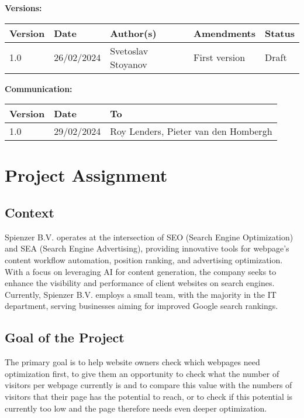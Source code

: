 \documentclass[12pt,a4paper]{article}
\begin{document}
\vspace{1em} %

\textbf{Versions:} 
\vspace{1em}

\begin{tabular}{|l|l|l|p{5cm}|l|}
    \hline
    Version & Date & Author(s) & Amendments & Status \\
    \hline
    1.0 & 26/02/2024 & Svetoslav Stoyanov & First version & Draft \\
    \hline
\end{tabular}

\vspace{1em} %

\textbf{Communication:} 
\vspace{1em} %

\begin{tabular}{|l|l|l|}
    \hline
    Version & Date & To \\
    \hline
    1.0 & 29/02/2024 & Roy Lenders, Pieter van den Hombergh \\
    \hline
\end{tabular}

\newpage

\tableofcontents
\newpage

\section{Project Assignment}
\subsection{Context}
Spienzer B.V. operates at the intersection of SEO (Search Engine Optimization) and SEA (Search Engine Advertising), providing innovative tools for webpage’s content workflow automation, position ranking, and advertising optimization. With a focus on leveraging AI for content generation, the company seeks to enhance the visibility and performance of client websites on search engines. Currently, Spienzer B.V. employs a small team, with the majority in the IT department, serving businesses aiming for improved Google search rankings.
\subsection{Goal of the Project}
The primary goal is to help website owners check which webpages need optimization first, to give them an opportunity to check what the number of visitors per webpage currently is and to compare this value with the numbers of visitors that their page has the potential to reach, or to check if this potential is currently too low and the page therefore needs even deeper optimization.
\end{document}
